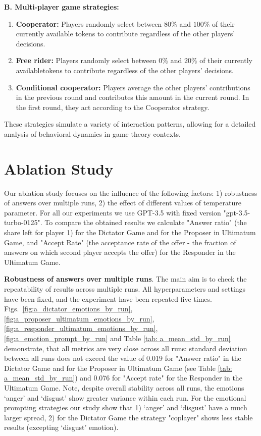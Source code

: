 \documentclass{article}
\begin{document}
\textbf{B. Multi-player game strategies:}

\begin{enumerate}
    \item \textbf{Cooperator:} Players randomly select between $80\%$ and $100\%$ of their currently available tokens to contribute regardless of the other players' decisions.
    
    \item \textbf{Free rider:} Players randomly select between $0\%$ and $20\%$ of their currently availabletokens to contribute regardless of the other players' decisions.
    
    \item \textbf{Conditional cooperator:} Players average the other players' contributions in the previous round and contributes this amount in the current round. In the first round, they act according to the Cooperator strategy.
    
\end{enumerate}


These strategies simulate a variety of interaction patterns, allowing for a detailed analysis of behavioral dynamics in game theory contexts.

\FloatBarrier
\newpage

\section{Ablation Study}
\label{app: ablation}
Our ablation study focuses on the influence of the following factors: 1) robustness of answers over multiple runs, 2) the effect of different values of temperature parameter.
For all our experiments we use GPT-3.5 with fixed version "gpt-3.5-turbo-0125". To compare the obtained results we calculate "Answer ratio" (the share left for player 1) for the Dictator Game and for the Proposer in Ultimatum Game, and "Accept Rate" (the acceptance rate of the offer - the fraction of answers on which second player accepts the offer) for the Responder in the Ultimatum Game.

\textbf{Robustness of answers over multiple runs}. The main aim is to check the repeatability of results across multiple runs. All hyperparameters and settings have been fixed, and the experiment have been repeated five times. Figs.~\ref{fig:a_dictator_emotions_by_run}, \ref{fig:a_proposer_ultimatum_emotions_by_run}, \ref{fig:a_responder_ultimatum_emotions_by_run}, \ref{fig:a_emotion_prompt_by_run} and Table \ref{tab: a_mean_std_by_run} demonstrate, that all metrics are very close across all runs: standard deviation between all runs does not exceed the value of 0.019 for "Answer ratio" in the Dictator Game and for the Proposer in Ultimatum Game (see Table \ref{tab: a_mean_std_by_run}) and 0.076 for "Accept rate" for the Responder in the Ultimatum Game. Note, despite overall stability across all runs, the emotions `anger' and `disgust' show greater variance within each run.
For the emotional prompting strategies our study show that 1) `anger' and `disgust' have a much larger spread, 2) for the Dictator Game the strategy "coplayer" shows less stable results (excepting `disgust' emotion).
\end{document}
